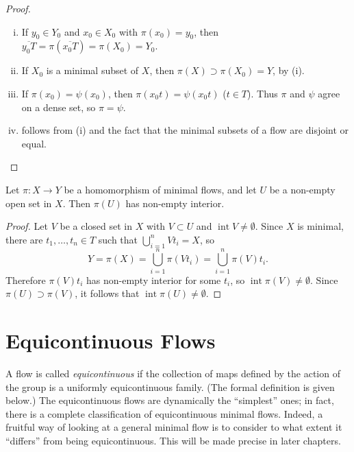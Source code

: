 \begin{proof}~
    \begin{enumerate}[(i)]
        \item If $y_0 \in Y_0$ and $x_0 \in X_0$ with $\pi(x_0) = y_0$, then $\overline{y_0 T} = \pi(\overline{x_0 T}) = \pi(X_0) = Y_0$.
        \item If $X_0$ is a minimal subset of $X$, then $\pi(X) \supset \pi(X_0) = Y$, by (i).
        \item If $\pi(x_0) = \psi(x_0)$, then $\pi(x_0 t) = \psi(x_0 t)$ ($t \in T$). Thus $\pi$ and $\psi$ agree on a dense set, so $\pi = \psi$.
        \item follows from (i) and the fact that the minimal subsets of a flow are disjoint or equal.
    \end{enumerate}
\end{proof}



\begin{theorem}
    Let $\pi : X \to Y$ be a homomorphism of minimal flows, and let $U$ be a non-empty open set in $X$. Then $\pi(U)$ has non-empty interior.
\end{theorem}

\begin{proof}
    Let $V$ be a closed set in $X$ with $V \subset U$ and $\operatorname{int} V \ne \emptyset$. Since $X$ is minimal, there are $t_1, \ldots, t_n \in T$ such that $\bigcup_{i=1}^n V t_i = X$, so
    \[
        Y = \pi(X) = \bigcup_{i=1}^n \pi(V t_i) = \bigcup_{i=1}^n \pi(V)t_i.
    \]
    Therefore $\pi(V)t_i$ has non-empty interior for some $t_i$, so $\operatorname{int} \pi(V) \ne \emptyset$. Since $\pi(U) \supset \pi(V)$, it follows that $\operatorname{int} \pi(U) \ne \emptyset$.
\end{proof}







\section{Equicontinuous Flows}


A flow is called \emph{equicontinuous} if the collection of maps defined by the action of the group is a uniformly equicontinuous family. (The formal definition is given below.) The equicontinuous flows are dynamically the ``simplest'' ones; in fact, there is a complete classification of equicontinuous minimal flows. Indeed, a fruitful way of looking at a general minimal flow is to consider to what extent it ``differs'' from being equicontinuous. This will be made precise in later chapters.

